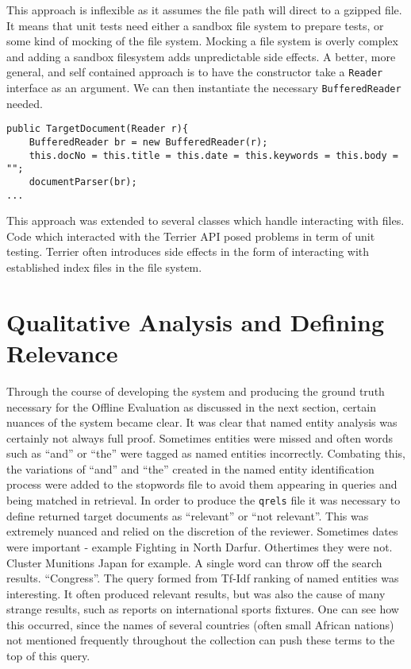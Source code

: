 \documentclass{l4proj}
\newcommand{\code}[1]{\texttt{#1}}
\begin{document}
This approach is inflexible as it assumes the file path will direct to a gzipped file. It means that unit tests need either a sandbox file system to prepare tests, or some kind of mocking of the file system. Mocking a file system is overly complex and adding a sandbox filesystem adds unpredictable side effects.
A better, more general, and self contained approach is to have the constructor take a \code{Reader} interface as an argument. We can then instantiate the necessary \code{BufferedReader} needed.

\begin{verbatim}
public TargetDocument(Reader r){
    BufferedReader br = new BufferedReader(r);
    this.docNo = this.title = this.date = this.keywords = this.body = "";
    documentParser(br);
...
\end{verbatim}

This approach was extended to several classes which handle interacting with files.
Code which interacted with the Terrier API posed problems in term of unit testing. Terrier often introduces side effects in the form of interacting with established index files in the file system.
\section{Qualitative Analysis and Defining Relevance}
Through the course of developing the system and producing the ground truth necessary for the Offline Evaluation as discussed in the next section, certain nuances of the system became clear.
It was clear that named entity analysis was certainly not always full proof. Sometimes entities were missed and often words such as ``and'' or ``the'' were tagged as named entities incorrectly. Combating this, the variations of ``and'' and ``the'' created in the named entity identification process were added to the stopwords file to avoid them appearing in queries and being matched in retrieval.
In order to produce the \code{qrels} file it was necessary to define returned target documents as ``relevant'' or ``not relevant''. This was extremely nuanced and relied on the discretion of the reviewer.
Sometimes dates were important - example Fighting in North Darfur.
Othertimes they were not. Cluster Munitions Japan for example.
A single word can throw off the search results. ``Congress''.
The query formed from Tf-Idf ranking of named entities was interesting. It often produced relevant results, but was also the cause of many strange results, such as reports on international sports fixtures. One can see how this occurred, since the names of several countries (often small African nations) not mentioned frequently throughout the collection can push these terms to the top of this query.
\end{document}
